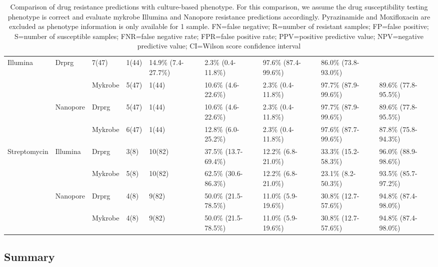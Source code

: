\begin{table}
{\begin{tabular}{|l|l|l|l|l|l|l|l|l|}
  \multirow{2}{*}{Illumina} &
  Drprg &
  7(47) &
  1(44) &
  14.9\% (7.4-27.7\%) &
  2.3\% (0.4-11.8\%) &
  97.6\% (87.4-99.6\%) &
  86.0\% (73.8-93.0\%) \\ \cline{3-9} 
 &
   &
  Mykrobe &
  5(47) &
  1(44) &
  10.6\% (4.6-22.6\%) &
  2.3\% (0.4-11.8\%) &
  97.7\% (87.9-99.6\%) &
  89.6\% (77.8-95.5\%) \\ \cline{2-9} 
 &
  \multirow{2}{*}{Nanopore} &
  Drprg &
  5(47) &
  1(44) &
  10.6\% (4.6-22.6\%) &
  2.3\% (0.4-11.8\%) &
  97.7\% (87.9-99.6\%) &
  89.6\% (77.8-95.5\%) \\ \cline{3-9} 
 &
   &
  Mykrobe &
  6(47) &
  1(44) &
  12.8\% (6.0-25.2\%) &
  2.3\% (0.4-11.8\%) &
  97.6\% (87.7-99.6\%) &
  87.8\% (75.8-94.3\%) \\ \hline
\multirow{4}{*}{Streptomycin} &
  \multirow{2}{*}{Illumina} &
  Drprg &
  3(8) &
  10(82) &
  37.5\% (13.7-69.4\%) &
  12.2\% (6.8-21.0\%) &
  33.3\% (15.2-58.3\%) &
  96.0\% (88.9-98.6\%) \\ \cline{3-9} 
 &
   &
  Mykrobe &
  5(8) &
  10(82) &
  62.5\% (30.6-86.3\%) &
  12.2\% (6.8-21.0\%) &
  23.1\% (8.2-50.3\%) &
  93.5\% (85.7-97.2\%) \\ \cline{2-9} 
 &
  \multirow{2}{*}{Nanopore} &
  Drprg &
  4(8) &
  9(82) &
  50.0\% (21.5-78.5\%) &
  11.0\% (5.9-19.6\%) &
  30.8\% (12.7-57.6\%) &
  94.8\% (87.4-98.0\%) \\ \cline{3-9} 
 &
   &
  Mykrobe &
  4(8) &
  9(82) &
  50.0\% (21.5-78.5\%) &
  11.0\% (5.9-19.6\%) &
  30.8\% (12.7-57.6\%) &
  94.8\% (87.4-98.0\%) \\ \hline
\end{tabular}%
}
\caption{Comparison of drug resistance predictions with culture-based phenotype. For this comparison, we assume the drug susceptibility testing phenotype is correct and evaluate mykrobe Illumina and Nanopore resistance predictions accordingly. Pyrazinamide and Moxifloxacin are excluded as phenotype information is only available for 1 sample. FN=false negative; R=number of resistant samples; FP=false positive; S=number of susceptible samples; FNR=false negative rate; FPR=false positive rate; PPV=positive predictive value; NPV=negative predictive value; CI=Wilson score confidence interval}
\label{tab:pheno-concordance}
\end{table}

\subsection{Summary}

